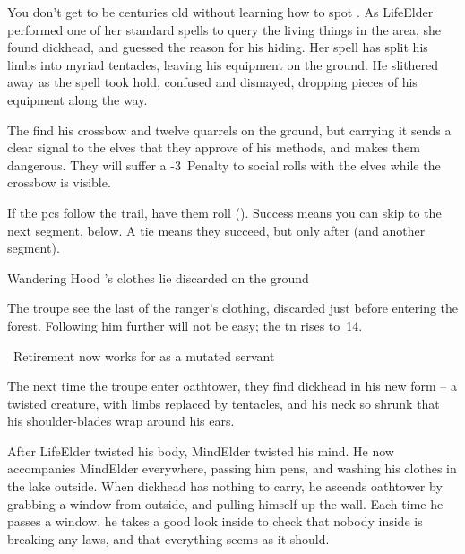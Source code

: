\begin{exampletext}
  You don't get to be centuries old without learning how to spot .
  As \gls{LifeElder} performed one of her standard spells to query the living things in the area, she found \gls{dickhead}, and guessed the reason for his hiding.
  Her spell has split his limbs into myriad tentacles, leaving his equipment on the ground.
  He slithered away as the spell took hold, confused and dismayed, dropping pieces of his equipment along the way.
\end{exampletext}

The find his \gls{crossbow} and twelve quarrels on the ground, but carrying it sends a clear signal to the elves that they approve of his methods, and makes them dangerous.
They will suffer a -3~Penalty to social rolls with the elves while the \gls{crossbow} is visible.

If the \glspl{pc} follow the trail, have them roll  (\tn[10]).
Success means you can skip to the next \gls{segment}, below.
A tie means they succeed, but only after  (and another \gls{segment}).

{Wandering Hood}%
{'s clothes lie discarded on the ground}%

The troupe see the last of the ranger's clothing, discarded just before entering the forest.
Following him further will not be easy; the \gls{tn} rises to~14.

{\squash~Retirement}%
{ now works for  as a mutated servant}%

The next time the troupe enter \gls{oathtower}, they find \gls{dickhead} in his new form -- a twisted creature, with limbs replaced by tentacles, and his neck so shrunk that his shoulder-blades wrap around his ears.

After \gls{LifeElder} twisted his body, \gls{MindElder} twisted his mind.
He now accompanies \gls{MindElder} everywhere, passing him pens, and washing his clothes in the lake outside.
When \gls{dickhead} has nothing to carry, he ascends \gls{oathtower} by grabbing a window from outside, and pulling himself up the wall.
Each time he passes a window, he takes a good look inside to check that nobody inside is breaking any laws, and that everything seems as it should.


\dickheadReborn

